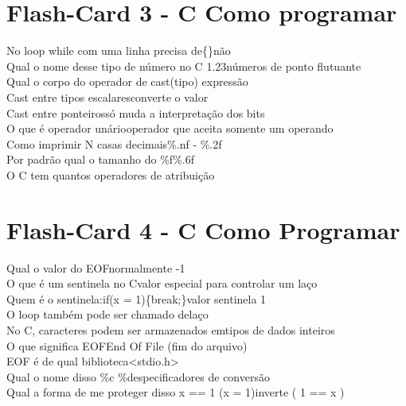 \documentclass[a4paper,12pt]{article}
\begin{document}
\section*{Flash-Card 3 - C Como programar} 
No loop while com uma linha precisa de\{\}\dotfill não\\ 
Qual o nome desse tipo de número no C 1.23\dotfill números de ponto flutuante\\ 
Qual o corpo do operador de cast\dotfill (tipo) expressão\\ 
Cast entre tipos escalares\dotfill converte o valor\\ 
Cast entre ponteiros\dotfill só muda a interpretação dos bits\\ 
O que é operador unário\dotfill operador que aceita somente um operando\\ 
Como imprimir N casas decimais\dotfill \%.nf - \%.2f\\ 
Por padrão qual o tamanho do \%f\dotfill \%.6f\\ 
O C tem quantos operadores de atribuição\\ 

\section*{Flash-Card 4 - C Como Programar} 
Qual o valor do EOF\dotfill normalmente -1\\ 
O que é um sentinela no C\dotfill valor especial para controlar um laço\\
Quem é o sentinela:\;if(x = 1)\;\{break;\}\dotfill valor sentinela 1\\ 
O loop também pode ser chamado de\dotfill laço\\ 
No C, caracteres podem ser armazenados em\dotfill tipos de dados inteiros\\ 
O que significa EOF\dotfill End Of File (fim do arquivo)\\ 
EOF é de qual biblioteca\dotfill <stdio.h>\\ 
Qual o nome disso \%c \%d\dotfill especificadores de conversão\\ 
Qual a forma de me proteger disso x == 1 (x = 1)\dotfill inverte ( 1 == x )\\ 
\end{document}
